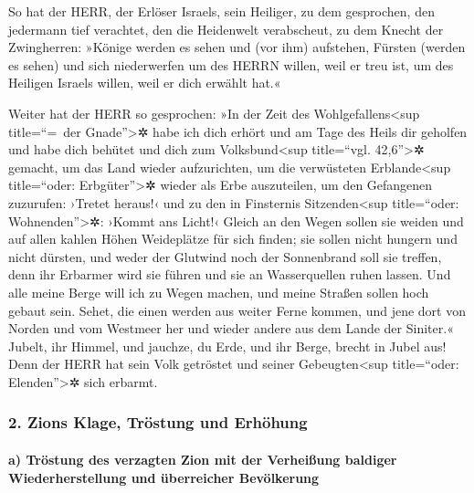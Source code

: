 So hat der HERR, der Erlöser Israels, sein Heiliger, zu
dem gesprochen, den jedermann tief verachtet, den die Heidenwelt
verabscheut, zu dem Knecht der Zwingherren: »Könige werden es sehen und
(vor ihm) aufstehen, Fürsten (werden es sehen) und sich niederwerfen um
des HERRN willen, weil er treu ist, um des Heiligen Israels willen, weil
er dich erwählt hat.«

Weiter hat der HERR so gesprochen: »In der Zeit des
Wohlgefallens\textless sup title=``=~der Gnade''\textgreater✲ habe ich
dich erhört und am Tage des Heils dir geholfen und habe dich behütet und
dich zum Volksbund\textless sup title=``vgl. 42,6''\textgreater✲
gemacht, um das Land wieder aufzurichten, um die verwüsteten
Erblande\textless sup title=``oder: Erbgüter''\textgreater✲ wieder als
Erbe auszuteilen, um den Gefangenen zuzurufen: ›Tretet
heraus!‹ und zu den in Finsternis Sitzenden\textless sup title=``oder:
Wohnenden''\textgreater✲: ›Kommt ans Licht!‹ Gleich an den Wegen sollen
sie weiden und auf allen kahlen Höhen Weideplätze für sich finden;
sie sollen nicht hungern und nicht dürsten, und weder der
Glutwind noch der Sonnenbrand soll sie treffen, denn ihr Erbarmer wird
sie führen und sie an Wasserquellen ruhen lassen. Und
alle meine Berge will ich zu Wegen machen, und meine Straßen sollen hoch
gebaut sein. Sehet, die einen werden aus weiter Ferne
kommen, und jene dort von Norden und vom Westmeer her und wieder andere
aus dem Lande der Siniter.« Jubelt, ihr Himmel, und
jauchze, du Erde, und ihr Berge, brecht in Jubel aus! Denn der HERR hat
sein Volk getröstet und seiner Gebeugten\textless sup title=``oder:
Elenden''\textgreater✲ sich erbarmt.

\hypertarget{zions-klage-truxf6stung-und-erhuxf6hung}{%
\subsubsection{2. Zions Klage, Tröstung und
Erhöhung}\label{zions-klage-truxf6stung-und-erhuxf6hung}}

\hypertarget{a-truxf6stung-des-verzagten-zion-mit-der-verheiuxdfung-baldiger-wiederherstellung-und-uxfcberreicher-bevuxf6lkerung}{%
\paragraph{a) Tröstung des verzagten Zion mit der Verheißung baldiger
Wiederherstellung und überreicher
Bevölkerung}\label{a-truxf6stung-des-verzagten-zion-mit-der-verheiuxdfung-baldiger-wiederherstellung-und-uxfcberreicher-bevuxf6lkerung}}

